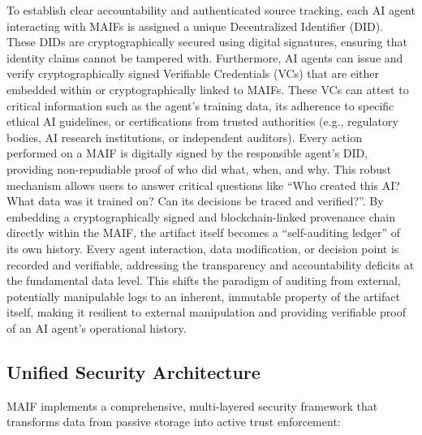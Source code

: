 \documentclass[conference]{IEEEtran}
\begin{document}
To establish clear accountability and authenticated source tracking, each AI agent interacting with MAIFs is assigned a unique Decentralized Identifier (DID)\cite{ref4}. These DIDs are cryptographically secured using digital signatures, ensuring that identity claims cannot be tampered with\cite{ref4}. Furthermore, AI agents can issue and verify cryptographically signed Verifiable Credentials (VCs) that are either embedded within or cryptographically linked to MAIFs. These VCs can attest to critical information such as the agent's training data, its adherence to specific ethical AI guidelines, or certifications from trusted authorities (e.g., regulatory bodies, AI research institutions, or independent auditors)\cite{ref4}. Every action performed on a MAIF is digitally signed by the responsible agent's DID, providing non-repudiable proof of who did what, when, and why. This robust mechanism allows users to answer critical questions like ``Who created this AI? What data was it trained on? Can its decisions be traced and verified?''\cite{ref4}. By embedding a cryptographically signed and blockchain-linked provenance chain directly within the MAIF, the artifact itself becomes a ``self-auditing ledger'' of its own history. Every agent interaction, data modification, or decision point is recorded and verifiable, addressing the transparency and accountability deficits at the fundamental data level. This shifts the paradigm of auditing from external, potentially manipulable logs to an inherent, immutable property of the artifact itself, making it resilient to external manipulation and providing verifiable proof of an AI agent's operational history.

\subsection{Unified Security Architecture}

MAIF implements a comprehensive, multi-layered security framework that transforms data from passive storage into active trust enforcement:
\end{document}
